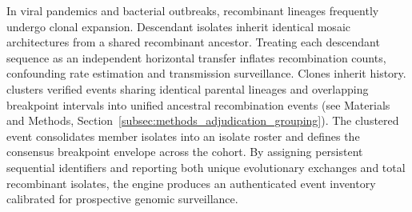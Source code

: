 In viral pandemics and bacterial outbreaks, recombinant lineages frequently undergo clonal expansion.
Descendant isolates inherit identical mosaic architectures from a shared recombinant ancestor.
Treating each descendant sequence as an independent horizontal transfer inflates recombination counts, confounding rate estimation and transmission surveillance.
Clones inherit history.
\RhizAeon clusters verified events sharing identical parental lineages and overlapping breakpoint intervals into unified ancestral recombination events (see Materials and Methods, Section~\ref{subsec:methods_adjudication_grouping}).
The clustered event consolidates member isolates into an isolate roster and defines the consensus breakpoint envelope across the cohort.
By assigning persistent sequential identifiers and reporting both unique evolutionary exchanges and total recombinant isolates, the engine produces an authenticated event inventory calibrated for prospective genomic surveillance.
